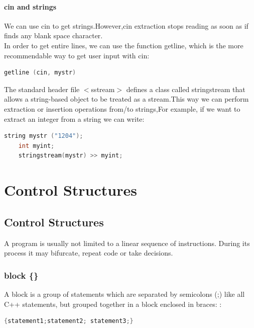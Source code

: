 \documentclass[12pt,oneside]{book}
\begin{document}
\subsubsection{cin and strings}
We can use cin to get strings.However,cin extraction stops reading as soon as if finds any blank space character.\\
In order to get entire lines, we can use the function getline, which is the more recommendable way to get user
input with cin:
\begin{lstlisting}[language=C++]
getline (cin, mystr)
\end{lstlisting}
The standard header file $<$sstream$>$ defines a class called stringstream that allows a string-based object to be treated as a stream.This way we can perform extraction or insertion operations from/to strings,For example, if we want to extract an integer from a
string we can write:
\begin{lstlisting}[language=C++]
    string mystr ("1204"); 
    int myint; 
    stringstream(mystr) >> myint;
\end{lstlisting}
\chapter{Control Structures}
\section{Control Structures}
A program is usually not limited to a linear sequence of instructions. During its process it may bifurcate, repeat code or take decisions.
\subsection{block \{\}}
A block is a group of statements which are separated by semicolons (;) like all C++ statements, but grouped together in a block enclosed in braces: { }:
\begin{lstlisting}[language=C++]
{statement1;statement2; statement3;}
\end{lstlisting}
\end{document}
